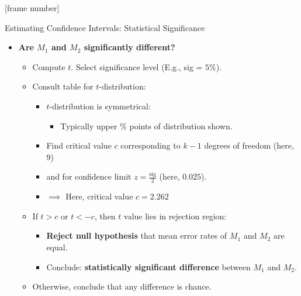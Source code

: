\documentclass[aspectratio=169,t,table]{beamer}
\begin{document}
  {
    [frame number]
    \begin{frame}{Estimating Confidence Intervals: Statistical Significance}
	  \begin{itemize}
	    \item \textbf{Are $M_1$ and $M_2$ {\color{airforceblue} significantly different}?}
		\begin{itemize}
		  \item Compute $t$. Select significance level (E.g., sig = $5 \%$).
      \item Consult table for $t$-distribution:
          \begin{itemize}
          	\item $t$-distribution is symmetrical:
          	\begin{itemize}
              \item Typically upper $\%$ points of distribution shown.
	        \end{itemize}
            \item Find critical value $c$ corresponding to $k-1$ degrees of freedom (here, $9$)
            \item and for confidence limit $z = \frac{\text{sig}}{2}$ (here, $0.025$).
            \item $\implies$ Here, critical value $c = 2.262$
          \end{itemize}
          \item If $t > c$ or $t < -c$, then $t$ value lies in rejection region:
	      \begin{itemize}
            \item \textbf{Reject null hypothesis} that mean error rates of $M_1$ and $M_2$ are equal.
            \item Conclude: \textbf{statistically significant difference} between $M_1$ and $M_2$.
	      \end{itemize}
	      \item Otherwise, conclude that any difference is chance.
        \end{itemize}
      \end{itemize}
    \end{frame}
  }
\end{document}
